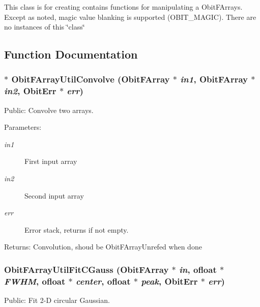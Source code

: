 This class is for creating contains functions for manipulating a Obit\-FArrays. Except as noted, magic value blanking is supported (OBIT\_\-MAGIC). There are no instances of this \char`\"{}class\char`\"{}

\subsection{Function Documentation}
\subsubsection{$\ast$ Obit\-FArray\-Util\-Convolve ({\bf Obit\-FArray} $\ast$ {\em in1}, {\bf Obit\-FArray} $\ast$ {\em in2}, {\bf Obit\-Err} $\ast$ {\em err})}\label{ObitFArrayUtil_8h_a1}


Public: Convolve two arrays. 

\begin{Desc}
\item[Parameters:]
\begin{description}
\item[{\em in1}]First input array \item[{\em in2}]Second input array \item[{\em err}]Error stack, returns if not empty. \end{description}
\end{Desc}
\begin{Desc}
\item[Returns:]Convolution, shoud be Obit\-FArray\-Unrefed when done \end{Desc}
\subsubsection{ Obit\-FArray\-Util\-Fit\-CGauss ({\bf Obit\-FArray} $\ast$ {\em in}, {\bf ofloat} $\ast$ {\em FWHM}, {\bf ofloat} $\ast$ {\em center}, {\bf ofloat} $\ast$ {\em peak}, {\bf Obit\-Err} $\ast$ {\em err})}\label{ObitFArrayUtil_8h_a0}


Public: Fit 2-D circular Gaussian. 

